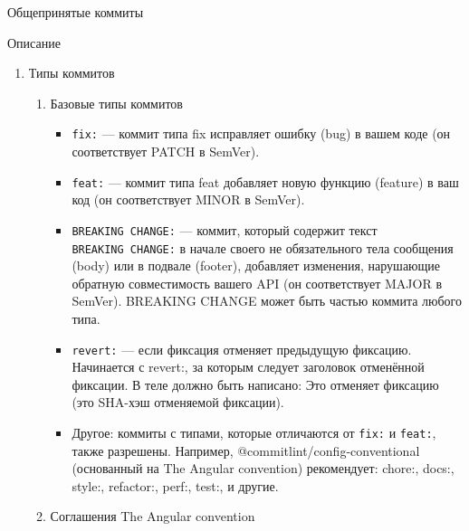 \documentclass[
  ignorenonframetext,
  aspectratio=169,
  russian,
]{beamer}
\providecommand{\tightlist}{%
  \setlength{\itemsep}{0pt}\setlength{\parskip}{0pt}}
\begin{document}
\begin{frame}[fragile]{Общепринятые коммиты}
\begin{block}{Описание}
\begin{itemize}[<+->]
\begin{enumerate}[<+->]
\begin{itemize}[<+->]
      \begin{itemize}[<+->]
      \tightlist
      \item
        Следует использовать для указания внешних ссылок, контекста
        коммита или другой мета информации.
      \item
        Также содержит ссылку на issue (например, на github), который
        закрывает эта фиксация.
      \item
        Критические изменения должны начинаться со слова
        \texttt{BREAKING\ CHANGE}: с пробела или двух символов новой
        строки. Затем для этого используется остальная часть сообщения
        фиксации.
      \end{itemize}
    \end{itemize}
  \item
    Типы коммитов

    \begin{enumerate}[<+->]
    \tightlist
    \item
      Базовые типы коммитов

      \begin{itemize}[<+->]
      \tightlist
      \item
        \texttt{fix:} --- коммит типа fix исправляет ошибку (bug) в
        вашем коде (он соответствует PATCH в SemVer).
      \item
        \texttt{feat:} --- коммит типа feat добавляет новую функцию
        (feature) в ваш код (он соответствует MINOR в SemVer).
      \item
        \texttt{BREAKING\ CHANGE:} --- коммит, который содержит текст
        \texttt{BREAKING\ CHANGE:} в начале своего не обязательного тела
        сообщения (body) или в подвале (footer), добавляет изменения,
        нарушающие обратную совместимость вашего API (он соответствует
        MAJOR в SemVer). BREAKING CHANGE может быть частью коммита
        любого типа.
      \item
        \texttt{revert:} --- если фиксация отменяет предыдущую фиксацию.
        Начинается с revert:, за которым следует заголовок отменённой
        фиксации. В теле должно быть написано: Это отменяет фиксацию
        (это SHA-хэш отменяемой фиксации).
      \item
        Другое: коммиты с типами, которые отличаются от \texttt{fix:} и
        \texttt{feat:}, также разрешены. Например,
        @commitlint/config-conventional (основанный на The Angular
        convention) рекомендует: chore:, docs:, style:, refactor:,
        perf:, test:, и другие.
      \end{itemize}
    \item
      Соглашения The Angular convention


\end{enumerate}
\end{enumerate}
\end{itemize}
\end{block}
\end{frame}
\end{document}
